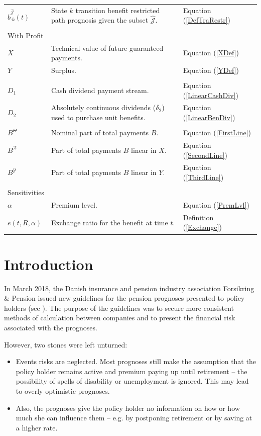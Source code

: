 \documentclass{article}
\newcommand{\1}[1]{\mathbbm{1}_{\left\lbrace #1 \right\rbrace}}
\theoremstyle{break}
\theoremstyle{remark}
\numberwithin{equation}{section}
\begin{document}
\begin{table}[H]
\begin{tabular}{lll}
		$\hat{b}_{\cdot k}^{\hat{\mathcal{J}}}(t)$ & State $k$ transition benefit restricted path prognosis given the subset $\hat{\mathcal{J}}$. & Equation (\ref{DefTraRestr}) \\
		&&\\
		With Profit&&\\
		\hline
		$X$& Technical value of future guaranteed payments. & Equation (\ref{XDef})\\
		$Y$& Surplus. & Equation (\ref{YDef}) \\
		&&\\
		$D_1$& Cash dividend payment stream. & Equation (\ref{LinearCashDiv})\\
		$D_2$& Absolutely continuous dividends ($\delta_2$) used to purchase unit benefits. & Equation (\ref{LinearBenDiv}) \\
		&&\\
		$B^\Theta$& Nominal part of total payments $B$. & Equation (\ref{FirstLine}) \\
		$B^\mathcal{X}$& Part of total payments $B$ linear in $X$. & Equation (\ref{SecondLine})\\
		$B^\mathcal{Y}$& Part of total payments $B$ linear in $Y$. & Equation (\ref{ThirdLine}) \\
		&&\\
		Sensitivities&&\\
		\hline
		$\alpha$& Premium level. & Equation (\ref{PremLvl}) \\
		$e(t,R,\alpha)$& Exchange ratio for the benefit at time $t$. & Definition (\ref{Exchange})
	\end{tabular}
\end{table}

\newpage

\section{Introduction}

In March 2018, the Danish insurance and pension industry association Forsikring \& Pension issued new guidelines for the pension prognoses presented to policy holders (see \cite{Henstilling}). The purpose of the guidelines was to secure more consistent methods of calculation between companies and to present the financial risk associated with the prognoses.

However, two stones were left unturned:

\begin{itemize}
	\item Events risks are neglected. Most prognoses still make the assumption that the policy holder remains active and premium paying up until retirement -- the possibility of spells of disability or unemployment is ignored. This may lead to overly optimistic prognoses.
	\item Also, the prognoses give the policy holder no information on how or how much she can influence them -- e.g. by postponing retirement or by saving at a higher rate.
\end{itemize}
\end{document}
